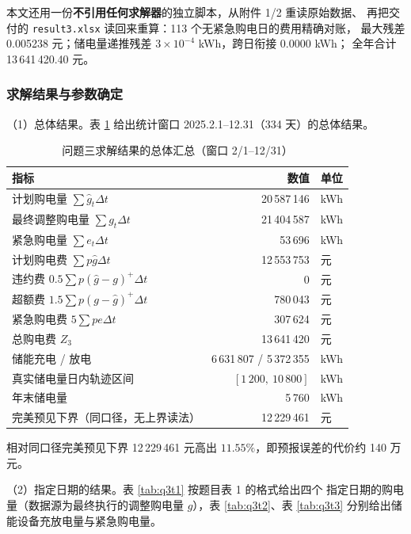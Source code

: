 \documentclass[withoutpreface]{cumcmthesis}
\renewcommand{\emph}[1]{\textbf{#1}}
\newcommand{\hd}[1]{\textbf{#1}}
\begin{document}
本文还用一份\emph{不引用任何求解器}的独立脚本，从附件 1/2 重读原始数据、
再把交付的 \texttt{result3.xlsx} 读回来重算：113 个无紧急购电日的费用精确对账，
最大残差 0.005238 元；储电量递推残差 $3\times10^{-4}$ kWh，跨日衔接 0.0000 kWh；
全年合计 13\,641\,420.40 元。

\subsubsection{求解结果与参数确定}

\noindent（1）总体结果。表 \ref{tab:q3summary} 给出统计窗口
2025.2.1--12.31（334 天）的总体结果。

\begin{table}[!htbp]
  \centering
  \caption{问题三求解结果的总体汇总（窗口 2/1--12/31）}\label{tab:q3summary}
  \begin{tabular}{l r l}
    \toprule[1.5pt]
    \hd{指标} & \hd{数值} & \hd{单位}\\
    \midrule[1pt]
    计划购电量 $\sum\hat g_t\Delta t$ & 20\,587\,146 & kWh\\
    最终调整购电量 $\sum g_t\Delta t$ & 21\,404\,587 & kWh\\
    紧急购电量 $\sum e_t\Delta t$     & 53\,696      & kWh\\
    \midrule[1pt]
    计划购电费 $\sum p\hat g\Delta t$ & 12\,553\,753 & 元\\
    违约费 $0.5\sum p(\hat g-g)^{+}\Delta t$ & 0 & 元\\
    超额费 $1.5\sum p(g-\hat g)^{+}\Delta t$ & 780\,043 & 元\\
    紧急购电费 $5\sum p e\Delta t$    & 307\,624     & 元\\
    \midrule[1pt]
    总购电费 $Z_3$ & 13\,641\,420 & 元\\
    \midrule[1pt]
    储能充电 / 放电 & 6\,631\,807 / 5\,372\,355 & kWh\\
    真实储电量日内轨迹区间 & $[1\,200,\ 10\,800]$ & kWh\\
    年末储电量 & 5\,760 & kWh\\
    完美预见下界（同口径，无上界读法） & 12\,229\,461 & 元\\
    \bottomrule[1.5pt]
  \end{tabular}
\end{table}

相对同口径完美预见下界 12\,229\,461 元高出 $11.55\%$，即预报误差的代价约 140 万元。

\noindent（2）指定日期的结果。表 \ref{tab:q3t1} 按题目表 1 的格式给出四个
指定日期的购电量（数据源为最终执行的调整购电量 $g$），表 \ref{tab:q3t2}、表
\ref{tab:q3t3} 分别给出储能设备充放电量与紧急购电量。
\end{document}
